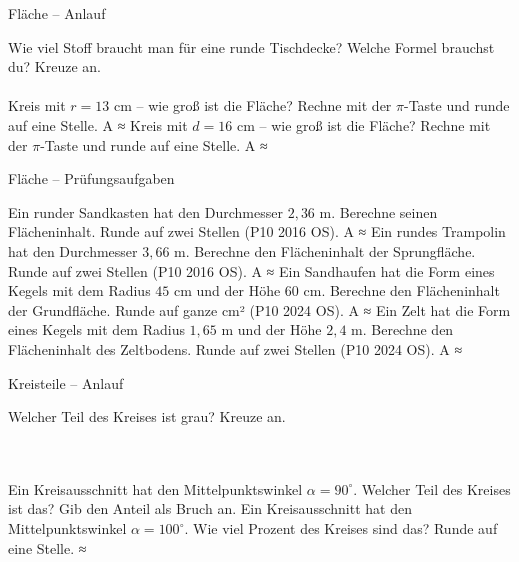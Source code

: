 \setcounter{aufgabe}{43}

\begin{aufgabe}{Fläche – Anlauf}
\begin{teile}
\teil Wie viel Stoff braucht man für eine runde Tischdecke? Welche Formel brauchst du? Kreuze an.\\ \\ 
\teil Kreis mit $r = 13$ cm – wie groß ist die Fläche? Rechne mit der $\pi$-Taste und runde auf eine Stelle. A ≈ \leerfeld[cm²]
\teil Kreis mit $d = 16$ cm – wie groß ist die Fläche? Rechne mit der $\pi$-Taste und runde auf eine Stelle. A ≈ \leerfeld[cm²]
\end{teile}
\end{aufgabe}

\begin{aufgabe}{Fläche – Prüfungsaufgaben}
\begin{teile}
\teil Ein runder Sandkasten hat den Durchmesser $2{,}36$ m. Berechne seinen Flächeninhalt. Runde auf zwei Stellen \hfill (P10 2016 OS). A ≈ \leerfeld
\teil Ein rundes Trampolin hat den Durchmesser $3{,}66$ m. Berechne den Flächeninhalt der Sprungfläche. Runde auf zwei Stellen \hfill (P10 2016 OS). A ≈ \leerfeld
\teil Ein Sandhaufen hat die Form eines Kegels mit dem Radius $45$ cm und der Höhe $60$ cm. Berechne den Flächeninhalt der Grundfläche. Runde auf ganze cm² \hfill (P10 2024 OS). A ≈ \leerfeld
\teil Ein Zelt hat die Form eines Kegels mit dem Radius $1{,}65$ m und der Höhe $2{,}4$ m. Berechne den Flächeninhalt des Zeltbodens. Runde auf zwei Stellen \hfill (P10 2024 OS). A ≈ \leerfeld
\end{teile}
\end{aufgabe}

\begin{aufgabe}{Kreisteile – Anlauf}
\begin{teile}
\teil Welcher Teil des Kreises ist grau? Kreuze an.\\ \\ \\ 

\teil Ein Kreisausschnitt hat den Mittelpunktswinkel $\alpha = 90^\circ$. Welcher Teil des Kreises ist das? Gib den Anteil als Bruch an. \leerfeld
\teil Ein Kreisausschnitt hat den Mittelpunktswinkel $\alpha = 100^\circ$. Wie viel Prozent des Kreises sind das? Runde auf eine Stelle. ≈ \leerfeld[\%]
\end{teile}
\end{aufgabe}

